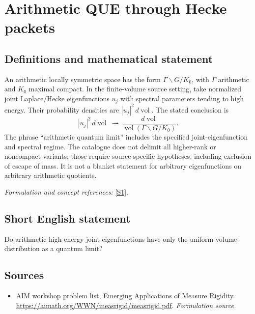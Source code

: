 \documentclass[11pt]{article}
\begin{document}
\section*{\texorpdfstring{Arithmetic QUE through Hecke packets}{Arithmetic QUE through Hecke packets}}\label{20003326}
\subsection{Definitions and mathematical statement}
An arithmetic locally symmetric space has the form $\Gamma\backslash G/K_0$, with $\Gamma$ arithmetic and $K_0$ maximal compact. In the finite-volume source setting, take normalized joint Laplace/Hecke eigenfunctions $u_j$ with spectral parameters tending to high energy. Their probability densities are $|u_j|^2\,d\operatorname{vol}$. The stated conclusion is
\[
 |u_j|^2\,d\operatorname{vol}\ \rightharpoonup\
 \frac{d\operatorname{vol}}{\operatorname{vol}(\Gamma\backslash G/K_0)}.
\]
The phrase ``arithmetic quantum limit'' includes the specified joint-eigenfunction and spectral regime. The catalogue does not delimit all higher-rank or noncompact variants; those require source-specific hypotheses, including exclusion of escape of mass. It is not a blanket statement for arbitrary eigenfunctions on arbitrary arithmetic quotients.
\par\smallskip\textit{Formulation and concept references:} \href{https://aimath.org/WWN/measrigid/measrigid.pdf}{[S1]}.

\subsection{Short English statement}
Do arithmetic high-energy joint eigenfunctions have only the uniform-volume distribution as a quantum limit?
\subsection{Sources}
\begin{itemize}
\item[S1]AIM workshop problem list, Emerging Applications of Measure Rigidity.
\url{https://aimath.org/WWN/measrigid/measrigid.pdf}.
\textit{Formulation source.}
\end{itemize}
\end{document}
